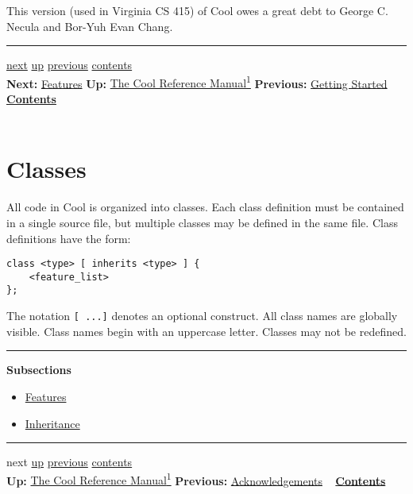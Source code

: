 \documentclass[]{article}
\begin{document}
This version (used in Virginia CS 415) of Cool owes a great debt to
George C. Necula and Bor-Yuh Evan Chang.

\begin{center}\rule{3in}{0.4pt}\end{center}

\href{node5.html}{next} \href{cool-manual.html}{up}
\href{node3.html}{previous} \href{node1.html}{contents} \\
\textbf{Next:} \href{node5.html}{Features} \textbf{Up:}
\href{cool-manual.html}{The Cool Reference Manual\textsuperscript{1}}
\textbf{Previous:} \href{node3.html}{Getting Started} ~
\textbf{\href{node1.html}{Contents}} \\ \\

\section{Classes}

All code in Cool is organized into classes. Each class definition must
be contained in a single source file, but multiple classes may be
defined in the same file. Class definitions have the form:

\begin{verbatim}
class <type> [ inherits <type> ] {
    <feature_list>
};
\end{verbatim}

The notation \texttt{{[} ...{]}} denotes an optional construct. All
class names are globally visible. Class names begin with an uppercase
letter. Classes may not be redefined.

\begin{center}\rule{3in}{0.4pt}\end{center}

\textbf{Subsections}

\begin{itemize}
\itemsep1pt\parskip0pt
\item
  \href{node5.html}{Features}
\item
  \href{node6.html}{Inheritance}
\end{itemize}

\begin{center}\rule{3in}{0.4pt}\end{center}

next \href{cool-manual.html}{up} \href{node49.html}{previous}
\href{node1.html}{contents} \\ \textbf{Up:} \href{cool-manual.html}{The
Cool Reference Manual\textsuperscript{1}} \textbf{Previous:}
\href{node49.html}{Acknowledgements} ~
\textbf{\href{node1.html}{Contents}} \\ \\
\end{document}
